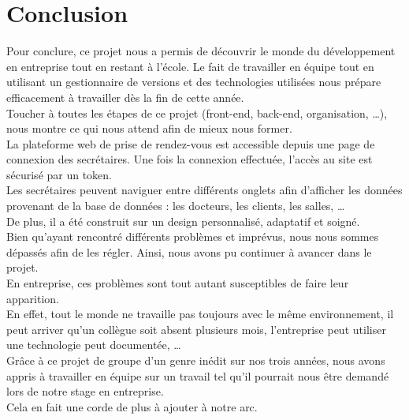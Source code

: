 
\section{Conclusion}
Pour conclure, ce projet nous a permis de découvrir le monde du développement en entreprise tout en restant à l'école. Le fait de travailler en équipe tout en utilisant un gestionnaire de versions et des technologies utilisées nous prépare efficacement à travailler dès la fin de cette année. \\
Toucher à toutes les étapes de ce projet (front-end, back-end, organisation, \dots), nous montre ce qui nous attend afin de mieux nous former. \\

La plateforme web de prise de rendez-vous est accessible depuis une page de connexion des secrétaires. Une fois la connexion effectuée, l'accès au site est sécurisé par un token. \\
Les secrétaires peuvent naviguer entre différents onglets afin d'afficher les données provenant de la base de données : les docteurs, les clients, les salles, \dots \\
De plus, il a été construit sur un design personnalisé, adaptatif et soigné. \\

Bien qu'ayant rencontré différents problèmes et imprévus, nous nous sommes dépassés afin de les régler. Ainsi, nous avons pu continuer à avancer dans le projet. \\
En entreprise, ces problèmes sont tout autant susceptibles de faire leur apparition. \\
En effet, tout le monde ne travaille pas toujours avec le même environnement, il peut arriver qu'un collègue soit absent plusieurs mois, l'entreprise peut utiliser une technologie peut documentée, \dots \\

Grâce à ce projet de groupe d'un genre inédit sur nos trois années, nous avons appris à travailler en équipe sur un travail tel qu'il pourrait nous être demandé lors de notre stage en entreprise. \\
Cela en fait une corde de plus à ajouter à notre arc.
